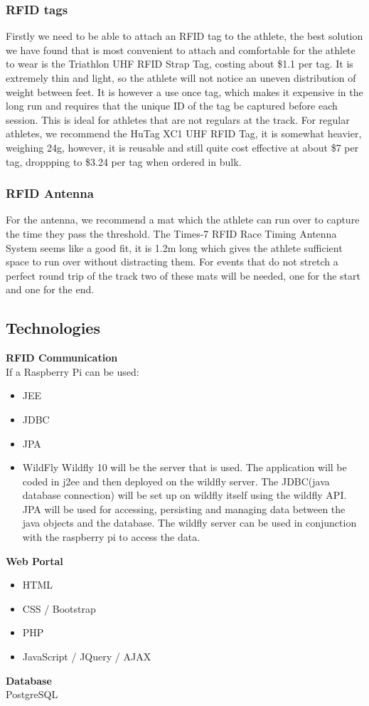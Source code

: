 \documentclass{article}
\begin{document}
\subsubsection{RFID tags}
Firstly we need to be able to attach an RFID tag to the athlete, the best solution we have found that is most convenient to attach and comfortable for the athlete to wear is the Triathlon UHF RFID Strap Tag, costing about \$1.1 per tag. It is extremely thin and light, so the athlete will not notice an uneven distribution of weight between feet. It is however a use once tag, which makes it expensive in the long run and requires that the unique ID of the tag be captured before each session. This is ideal for athletes that are not regulars at the track. For regular athletes, we recommend the HuTag XC1 UHF RFID Tag, it is somewhat heavier, weighing 24g, however, it is reusable and still quite cost effective at about \$7 per tag, droppping to \$3.24 per tag when ordered in bulk.

\subsubsection{RFID Antenna}
For the antenna, we recommend a mat which the athlete can run over to capture the time they pass the threshold. The Times-7 RFID Race Timing Antenna System seems like a good fit, it is 1.2m long which gives the athlete sufficient space to run over without distracting them. For events that do not stretch a perfect round trip of the track two of these mats will be needed, one for the start and one for the end.




\subsection{Technologies}
\textbf{RFID Communication} \\
If a Raspberry Pi can be used:  
\begin{itemize}
	\item JEE
	\item JDBC
	\item JPA
	\item WildFly
Wildfly 10 will be the server that is used. The application will be coded in j2ee and then deployed on the wildfly server. The JDBC(java database connection) will be set up on wildfly itself using the wildfly API. JPA will be used for accessing, persisting and managing data between the java objects and the database. The wildfly server can be used in conjunction with  the raspberry pi to access the data. 
\end{itemize}
\textbf{Web Portal} 
\begin{itemize}
	\item HTML
	\item CSS / Bootstrap
	\item PHP
	\item JavaScript / JQuery / AJAX
\end{itemize}
\textbf{Database} \\
PostgreSQL
\end{document}
